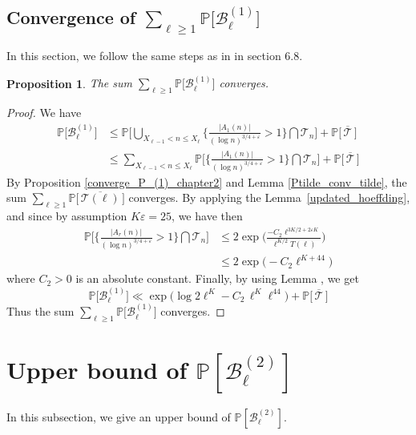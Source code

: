 \documentclass{article}
\newtheorem{prop}[theorem]{Proposition}
\begin{document}
\subsection{Convergence of \texorpdfstring{$\sum_{\ell \geqslant 1} \mathbb{P}\big[ \mathcal{B}^{(1)}_\ell\big]$}.}\label{section_convergenceofPB1}
In this section, we follow the same steps as in \cite{Rachid} in section 6.8. 
\begin{prop}\label{convergence_B_(1)}
    The sum $\sum_{\ell \geqslant 1} \mathbb{P}\big[ \mathcal{B}^{(1)}_\ell\big]$ converges.
\end{prop}
\begin{proof}[Proof]
    We have
    $$
    \begin{aligned}
        \mathbb{P}\big[ \mathcal{B}^{(1)}_\ell\big] & \leqslant \mathbb{P}\bigg[\bigcup_{X_{\ell-1} < n \leqslant   X_{\ell}} \bigg\{  \frac{|A_1(n)|}{(\log n )^{3/4 + \varepsilon}}> 1  \bigg\}\bigcap \mathcal{T}_n \bigg]+ \mathbb{P}\big[\,\overline{\mathcal{T}} \,\big]
        \\ & \leqslant \sum_{X_{\ell-1} < n \leqslant   X_{\ell}} \mathbb{P}\bigg[ \bigg\{  \frac{|A_1(n)|}{(\log n )^{3/4 + \varepsilon}}> 1  \bigg\}\bigcap \mathcal{T}_n \bigg] + \mathbb{P}\big[\,\overline{\mathcal{T}} \,\big]
    \end{aligned}
    $$
    By Proposition \ref{converge_P_(1)_chapter2} and Lemma \ref{Ptilde_conv_tilde}, the sum $\sum_{\ell \geqslant 1}\mathbb{P}\big[\,\overline{\mathcal{T}(\ell)} \,\big]$ converges. By applying the  Lemma~\ref{updated_hoeffding}, and since by assumption $K\varepsilon = 25$, we have then
    $$
    \begin{aligned}
        \mathbb{P}\bigg[ \bigg\{  \frac{|A_r(n)|}{(\log n )^{3/4 + \varepsilon}}> 1  \bigg\}\bigcap \mathcal{T}_n \bigg] & \leqslant 2 \exp \bigg(\frac{-C_2 \ell^{3K/2+2\varepsilon K}}{\ell^{K/2}T(\ell)} \bigg)
        \\ &\leqslant  2 \exp \bigg(-C_2 \ell^{K+44}\bigg)
    \end{aligned}
    $$
    where $C_2>0$ is an absolute constant. Finally, by using Lemma ,  we get
      $$
      \mathbb{P}\big[\mathcal{B}_{\ell}^{(1)}\big] \ll  \exp \bigg( \log 2\ell^{K}-C_2\, \ell^{K} \ell^{44} \bigg) + \mathbb{P}\big[\,\overline{\mathcal{T}} \,\big]
      $$
      Thus the sum $\sum_{\ell \geqslant 1}\mathbb{P}\big[\mathcal{B}_{\ell}^{(1)}\big]$ converges.
\end{proof}


\section{Upper bound of \texorpdfstring{$\mathbb{P}[\mathcal{B}^{(2)}_{\ell}]$}.}
 In this subsection,  we give an upper bound of $\mathbb{P}[\mathcal{B}_{\ell}^{(2)}]$.
\end{document}
